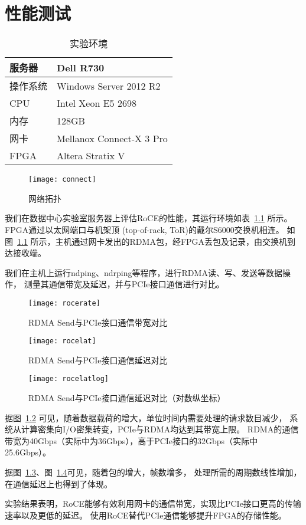 \chapter{性能测试}
\begin{table}[htbp]
\centering
\caption{实验环境}\label{tab:runconfig}
\begin{tabular}{l l}
\toprule
服务器 & Dell R730 \\
\midrule
操作系统 & Windows Server 2012 R2 \\
\midrule
CPU & Intel Xeon E5 2698 \\
\midrule
内存 & 128GB \\
\midrule
网卡 & Mellanox Connect-X 3 Pro \\
\midrule
FPGA & Altera Stratix V \\
\bottomrule
\end{tabular}
\end{table}
\begin{figure}[htbp]
\centering
\texttt{[image: connect]}
\caption{网络拓扑}\label{fig:connect}
\end{figure}
我们在数据中心实验室服务器上评估RoCE的性能，其运行环境如表~\ref{tab:runconfig} 所示。
FPGA通过以太网端口与机架顶 (top-of-rack, ToR)的戴尔S6000交换机\cite{s6000}相连。
如图~\ref{fig:connect} 所示，主机通过网卡发出的RDMA包，经FPGA丢包及记录，由交换机到达接收端。

我们在主机上运行ndping、ndrping等程序，进行RDMA读、写、发送等数据操作，
测量其通信带宽及延迟，并与PCIe接口通信进行对比。

\begin{figure}[htbp]
\centering
\texttt{[image: rocerate]}
\caption{RDMA Send与PCIe接口通信带宽对比}\label{fig:rocerate}
\end{figure}

\begin{figure}[htbp]
\centering
\texttt{[image: rocelat]}
\caption{RDMA Send与PCIe接口通信延迟对比}\label{fig:rocelat}
\end{figure}

\begin{figure}[htbp]
\centering
\texttt{[image: rocelatlog]}
\caption{RDMA Send与PCIe接口通信延迟对比（对数纵坐标）}\label{fig:rocelatlog}
\end{figure}

据图~\ref{fig:rocerate} 可见，随着数据载荷的增大，单位时间内需要处理的请求数目减少，
系统从计算密集向I/O密集转变，PCIe与RDMA均达到其带宽上限。
RDMA的通信带宽为40Gbps（实际中为36Gbps），高于PCIe接口的32Gbps（实际中25.6Gbps）。

据图~\ref{fig:rocelat}、图~\ref{fig:rocelatlog}可见，随着包的增大，帧数增多，
处理所需的周期数线性增加，在通信延迟上也得到了体现。

实验结果表明，RoCE能够有效利用网卡的通信带宽，实现比PCIe接口更高的传输速率以及更低的延迟。
使用RoCE替代PCIe通信能够提升FPGA的存储性能。
